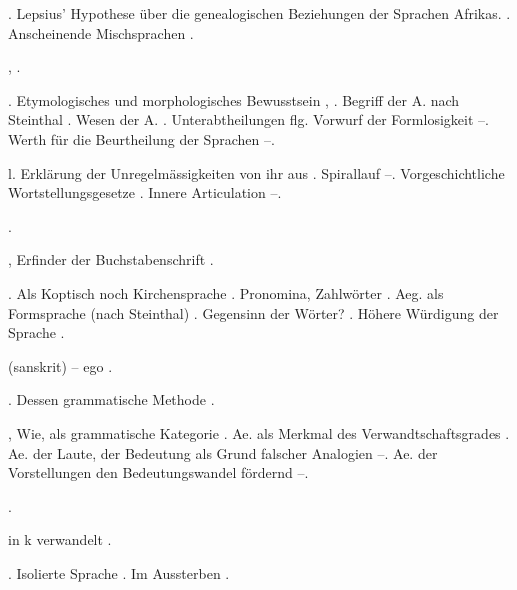 \begin{register}
. Lepsius’ Hypothese über die genealogischen Beziehungen der Sprachen Afrikas. \pageref{sp.282}. Anscheinende Mischsprachen \pageref{sp.406}.

 \pageref{sp.160}, \pageref{sp.282}.

. Etymologisches und morphologisches Bewusstsein \pageref{sp.124}, \pageref{sp.384}. Begriff der A. nach Steinthal \pageref{sp.337}. Wesen der A. \pageref{sp.345}. Unterabtheilungen \pageref{sp.349} flg. Vorwurf der Formlosigkeit \pageref{sp.396}–\pageref{sp.397}. Werth für die Beurtheilung der Sprachen \pageref{sp.403}–\pageref{sp.404}.


 l\pageref{sp.80}. Erklärung der Unregelmässigkeiten von ihr aus \pageref{sp.211}. Spirallauf \pageref{sp.255}–\pageref{sp.258}. Vorgeschichtliche Wortstellungsgesetze \pageref{sp.365}. Innere Articulation \pageref{sp.434}–\pageref{sp.436}.

 \pageref{sp.122}\sed{, \pageref{sp.349}}.

, Erfinder der Buchstabenschrift \pageref{sp.19}.

 \pageref{sp.142}. Als Koptisch noch Kirchensprache \pageref{sp.146}. Pronomina, Zahlwörter \pageref{sp.161}. Aeg. als Formsprache (nach Steinthal) \pageref{sp.336}.  Gegensinn der Wörter? \pageref{sp.380}. Höhere Würdigung der Sprache \pageref{sp.389}.

 (sanskrit) – ego \pageref{sp.214}.

. Dessen grammatische Methode \pageref{sp.110}.

, Wie, als grammatische Kategorie \pageref{sp.104}. Ae. als Merkmal des Verwandtschaftsgrades  \pageref{sp.159}. Ae. der Laute, der Bedeutung als Grund falscher Analogien \pageref{sp.211}–\pageref{sp.212}. Ae. der Vorstellungen den Bedeutungswandel fördernd \pageref{sp.232}–\pageref{sp.234}.

 \pageref{sp.149}\sed{, \pageref{sp.251}, \pageref{sp.426}}.

{\ain} in k verwandelt \pageref{sp.314}.

. Isolierte Sprache \pageref{sp.147}. Im Aussterben \pageref{sp.261}. 


\end{register}
